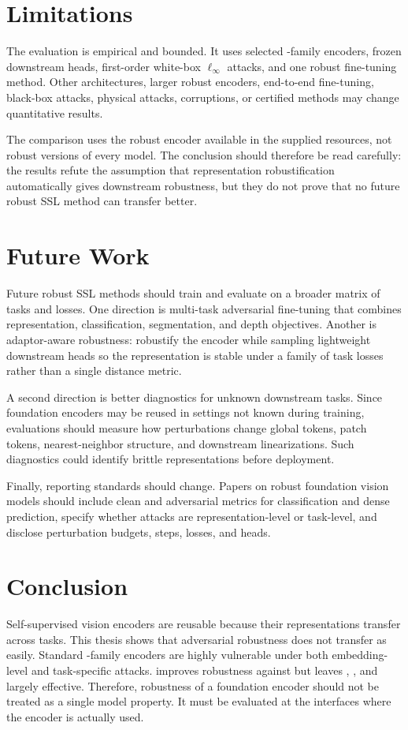 \section{Limitations}

The evaluation is empirical and bounded. It uses selected \DINO-family encoders, frozen downstream heads, first-order white-box $\ell_\infty$ attacks, and one robust fine-tuning method. Other architectures, larger robust encoders, end-to-end fine-tuning, black-box attacks, physical attacks, corruptions, or certified methods may change quantitative results.

The \DeACL comparison uses the robust encoder available in the supplied resources, not robust versions of every \DINOv model. The conclusion should therefore be read carefully: the results refute the assumption that representation robustification automatically gives downstream robustness, but they do not prove that no future robust SSL method can transfer better.

\section{Future Work}

Future robust SSL methods should train and evaluate on a broader matrix of tasks and losses. One direction is multi-task adversarial fine-tuning that combines representation, classification, segmentation, and depth objectives. Another is adaptor-aware robustness: robustify the encoder while sampling lightweight downstream heads so the representation is stable under a family of task losses rather than a single distance metric.

A second direction is better diagnostics for unknown downstream tasks. Since foundation encoders may be reused in settings not known during training, evaluations should measure how perturbations change global tokens, patch tokens, nearest-neighbor structure, and downstream linearizations. Such diagnostics could identify brittle representations before deployment.

Finally, reporting standards should change. Papers on robust foundation vision models should include clean and adversarial metrics for classification and dense prediction, specify whether attacks are representation-level or task-level, and disclose perturbation budgets, steps, losses, and heads.

\section{Conclusion}

Self-supervised vision encoders are reusable because their representations transfer across tasks. This thesis shows that adversarial robustness does not transfer as easily. Standard \DINO-family encoders are highly vulnerable under both embedding-level and task-specific attacks. \DeACL improves robustness against \EmbedAttack but leaves \PGD, \SegPGD, and \DepthPGD largely effective. Therefore, robustness of a foundation encoder should not be treated as a single model property. It must be evaluated at the interfaces where the encoder is actually used.
